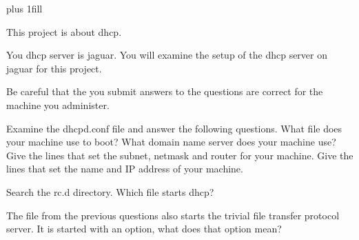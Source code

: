 
\rightskip=0pt plus 1fill

\parindent 0pt

This project is about dhcp.

You dhcp server is jaguar.
You will examine the setup of the dhcp server on jaguar for this project.

Be careful that the you submit answers to the questions are correct
for the machine you administer.

Examine the {\ltt{}dhcpd.conf} file and answer the following questions.
What file does your machine use to boot?
What domain name server does your machine use?
Give the lines that set the subnet, netmask and router for
your machine.
Give the lines that set the name and IP address of your machine.

Search the {\ltt{}rc.d} directory. 
Which file starts {\ltt{}dhcp}?


The file from the previous questions also starts the trivial file
transfer protocol server.
It is started with an option, what does that option mean?
\bye
